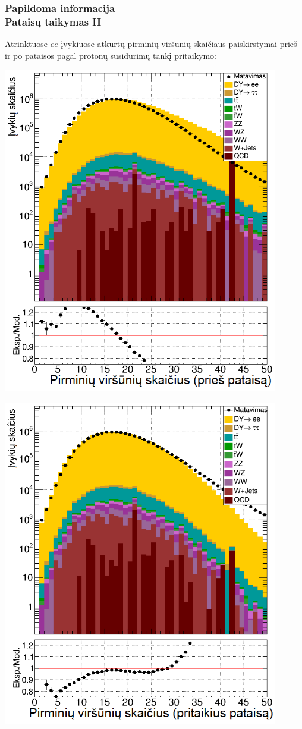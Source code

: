 \documentclass[xcolor=dvipsnames]{beamer}
\newcommand{\ee}{\mathit{ee}}
\begin{document}
\begin{frame}
	\frametitle{Papildoma informacija\\ \small Pataisų taikymas II}
	Atrinktuose $\ee$ įvykiuose atkurtų pirminių viršūnių skaičiaus paiskirstymai prieš ir po pataisos pagal protonų susidūrimų
	tankį pritaikymo:
	\begin{minipage}{0.49\textwidth}
		\centering
		\includegraphics[width=0.9\textwidth]{eeNVTXbefore_SMALL.png}
	\end{minipage}
	\hfill
	\begin{minipage}{0.49\textwidth}
		\centering
		\includegraphics[width=0.9\textwidth]{eeNVTXafter_SMALL.png}

\end{minipage}
\end{frame}
\end{document}
